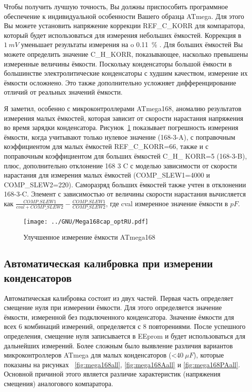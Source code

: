 Чтобы получить лучшую точность, Вы должны приспособить программное обеспечение к индивидуальной особенности Вашего 
образца ATmega. Для этого Вы можете установить напряжение коррекции REF\_C\_KORR для компаратора, который будет 
использоваться для измерения небольших ёмкостей. Коррекция в \(1~mV\) уменьшает результаты измерения на  o 0.11~\% .
Для больших ёмкостей Вы можете определить значение C\_H\_KORR, показывающее, насколько превышены измеренные величины 
ёмкости. Поскольку конденсаторы  большой ёмкости в большинстве электролитические конденсаторы с худшим качеством, 
измерение их ёмкости осложнено. Это также дополнительно усложняет дифференцирование отличий от реальных значений 
ёмкости.

Я заметил, особенно с микроконтроллерами ATmega168, аномалию результатов измерения малых ёмкостей, которая зависит 
от скорости нарастания напряжения во время зарядки конденсатора. Рисунок~\ref{fig:mega168optcap} показывает 
погрешность измерения ёмкости, когда учитывают только нулевое значение (168-3-A), с поправочным коэффициентом для 
малых ёмкостей REF\_C\_KORR=66, также и с поправочным коэффициентом для больших ёмкостей C\_H\_ KORR=5 (168-3-B), 
плюс, дополнительно отклонение 168 3 C с моделью зависимости от скорости нарастания для измерения малых 
ёмкостей (COMP\_SLEW1=4000  и COMP\_SLEW2=220). Саморазряд больших ёмкостей  также учтен в отклонении 168-3-C. 
Элемент с зависимостью от величины скорости нарастания вычисляется 
как \(\frac{COMP\_SLEW1}{cval+COMP\_SLEW2} - \frac{COMP\_SLEW1}{COMP\_SLEW2}\),
где cval  измеренное  значение ёмкости в \(pF\).

\begin{figure}[H]
\centering
\texttt{[image: ../GNU/Mega168cap\_optRU.pdf]}
\caption{Улучшенное измерение ёмкости ATmega168}
\label{fig:mega168optcap}
\end{figure}

\subsection{Автоматическая калибровка при измерении конденсаторов}

Автоматическая калибровка состоит из двух частей. Первая часть определяет смещение нуля при измерении ёмкости. 
Для этого определяется значение ёмкости, измеренной без подключенного конденсатора. Значение ёмкости для всех 6 
комбинаций измерений, определяется с 8 повторениями. После успешного определения, смещение нуля записывается в 
EEprom и будет использоваться для дальнейших измерений. Более сложным было выявление различия вариантов 
микроконтроллеров ATmega для малых конденсаторов (\textless \(40~\mu F\)),
которые показаны на рисунках ~\ref{fig:mega168all}, \ref{fig:mega168Aall} и \ref{fig:mega168PAall}.
Основной причиной  этого является различие характеристик (напряжения смещения) аналогового компаратора.

